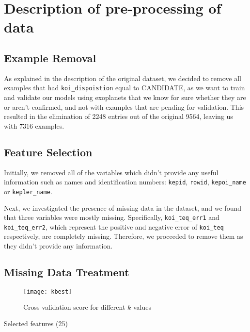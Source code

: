
\section{Description of pre-processing of data}%
\label{sec:desc-prep}


\subsection{Example Removal}

As explained in the description of the original dataset, we decided to remove all examples
that had \texttt{koi\_dispoistion} equal to CANDIDATE, as we want to train and validate our
models using exoplanets that we know for sure whether they are or aren't confirmed, and not
with examples that are pending for validation. This resulted in the elimination of 2248 entries
out of the original 9564, leaving us with 7316 examples.

\subsection{Feature Selection}%
\label{sub:feature_removal}

Initially, we removed all of the variables which didn't provide any useful information
such as names and identification numbers: \texttt{kepid}, \texttt{rowid}, 
\texttt{kepoi\_name} or \texttt{kepler\_name}.

Next, we investigated the presence of missing data in the dataset, and we found that three
variables were mostly missing. Specifically, \texttt{koi\_teq\_err1} and 
\texttt{koi\_teq\_err2}, which represent the positive and negative error 
of \texttt{koi\_teq} respectively, are completely missing. Therefore, we proceeded to 
remove them as they didn't provide any information.

\subsection{Missing Data Treatment}

\begin{figure}[H]
    \centering
    \texttt{[image: kbest]}
    \caption{Cross validation score for different $k$ values}%
    \label{fig:feature_cross}
\end{figure}

\begin{table}[H]
    \centering
    \caption{Selected features (25)}%
    \label{tab:features}
    
\end{table}